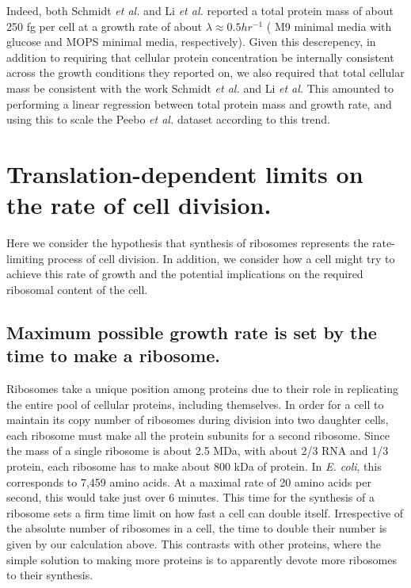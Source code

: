 \documentclass[11pt, letterpaper]{article}
\begin{document}
Indeed, both Schmidt {\it et al.} and Li {\it et al.} reported a total protein mass of about
250 fg per cell at a growth rate of about $\lambda \approx 0.5 hr^{-1}$ ( M9
minimal media with glucose and MOPS minimal media, respectively). Given this
descrepency, in addition to requiring that cellular protein concentration be
internally consistent across the growth conditions they reported on, we also
required that total cellular mass be consistent with the work Schmidt {\it et al.} and
Li {\it et al.} This amounted to performing a linear regression between total protein
mass and growth rate, and using this to scale the Peebo {\it et al.} dataset according
to this trend.



%
\newpage
\section{Translation-dependent limits on the rate of cell division.}

Here we consider the hypothesis that synthesis of ribosomes represents the
rate-limiting process of cell division. In addition, we consider how a cell
might try to achieve this rate of growth and the potential implications on the
required ribosomal content of the cell.

\subsection{Maximum possible growth rate is set by the time to make a ribosome.}


Ribosomes take a unique position among proteins due to their role in
replicating the entire pool of cellular proteins, including themselves. In
order for a cell to maintain its copy number of ribosomes during division into two
daughter cells, each ribosome must make all the protein subunits for a second
ribosome.  Since the  mass of a single ribosome is about 2.5 MDa, with about 2/3
RNA and 1/3 protein, each ribosome has to make about 800 kDa of protein. In {\it
E. coli}, this corresponds to 7,459 amino acids. At a maximal rate of 20 amino
acids per second, this would take just over 6 minutes.  This time for the
synthesis of a ribosome sets a firm time limit on how fast a cell can double
itself. Irrespective of the absolute number of ribosomes in a cell, the time to
double their number is given by our calculation above. This contrasts with other
proteins, where the simple solution to making more proteins is to apparently
devote more ribosomes to their synthesis.
\end{document}
